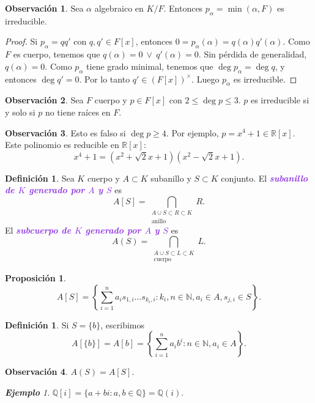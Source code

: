 \documentclass{article}
\newtheorem{proposition}[theorem]{Proposición}
\theoremstyle{definition}
\newtheorem{definition}[theorem]{Definición}
\newtheorem*{obs}{Observación}
\theoremstyle{remark}
\newtheorem{example}[theorem]{\textbf{Ejemplo}}
\numberwithin{equation}{section}
\newcommand{\N}{\mathbb{N}}
\newcommand{\Q}{\mathbb{Q}}
\newcommand{\R}{\mathbb{R}}
\renewcommand{\a}{\alpha}
\newcommand{\set}[1]{\left\{ #1 \right\}}
\newcommand{\wea}[1]{\textcolor{BlueViolet}{\textbf{\emph{#1}}}}
\begin{document}
\newpage %
\begin{obs}
  Sea $\a$ algebraico en $K/F$. Entonces $p_\a = \min(\a,F)$ es irreducible.
\end{obs}
\begin{proof}
  Si $p_\a = qq'$ con $q,q' \in F[x]$, entonces $0 = p_\a(\a) = q(\a) q'(\a)$. Como $F$ es cuerpo, tenemos que $q(\a) = 0 \ \lor \ q'(\a) = 0$. Sin pérdida de generalidad, $q(\a) = 0$. Como $p_\a$ tiene grado minimal, tenemos que $\deg p_\a = \deg q$, y entonces $\deg q' = 0$. Por lo tanto $q' \in (F[x])^\times$. Luego $p_\a$ es irreducible.
\end{proof}

\begin{obs}
  Sea $F$ cuerpo y $p \in F[x]$ con $2 \leq \deg p \leq 3$. $p$ es irreducible si y solo si $p$ no tiene raíces en $F$.
\end{obs}

\begin{obs}
  Esto es falso si $\deg p \geq 4$. Por ejemplo, $p = x^4 + 1 \in \R[x]$. Este polinomio es reducible en $\R[x]$:
  \[ x^4 + 1 = (x^2 + \sqrt{2} x + 1)(x^2 - \sqrt{2} x + 1). \]
\end{obs}

\begin{definition}
  Sea $K$ cuerpo y $A \subset K$ subanillo y $S \subset K$ conjunto. El \wea{subanillo de $K$ generado por $A$ y $S$} es
  \[ A[S] = \bigcap_{\substack{A \cup S \subset R \subset K \\ \text{anillo}}} R. \]
  El \wea{subcuerpo de $K$ generado por $A$ y $S$} es
  \[ A(S) = \bigcap_{\substack{A \cup S \subset L \subset K \\ \text{cuerpo}}} L. \]
\end{definition}

\begin{proposition}
  $$A[S] = \set{\sum_{i=1}^n a_i s_{1,i} \dots s_{k_i,i} : k_i, n \in \N, a_i \in A, s_{j,i} \in S}.$$
\end{proposition}

\begin{definition}
  Si $S = \{b\}$, escribimos
  \[ A[\{b\}] = A[b] = \set{\sum_{i=1}^n a_i b^i : n \in \N, a_i \in A}. \]
\end{definition}

\begin{obs}
  $A(S) = A[S]$.
\end{obs}

\begin{example}
  $\Q[i] = \{a + bi : a,b \in \Q\} = \Q(i)$.
\end{example}
\end{document}
